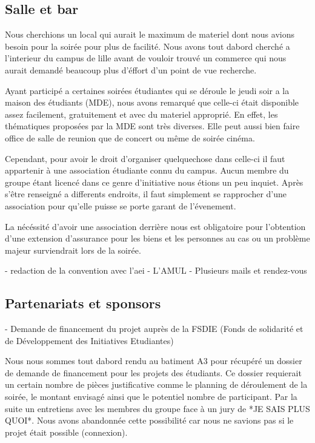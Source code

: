 \subsection{Salle et bar} %
\label{sub:salle_et_bar}

Nous cherchions un local qui aurait le maximum de materiel dont nous
avions besoin pour la soirée pour plus de facilité. Nous avons tout
dabord cherché a l'interieur du campus de lille avant de vouloir trouvé
un commerce qui nous aurait demandé beaucoup plus d'éffort d'un point de
vue recherche.

Ayant participé a certaines soirées étudiantes qui se déroule le jeudi
soir a la maison des étudiants (MDE), nous avons remarqué que celle-ci
était disponible assez facilement, gratuitement et avec du materiel
approprié. En effet, les thématiques proposées par la MDE sont très
diverses. Elle peut aussi bien faire office de salle de reunion que de
concert ou même de soirée cinéma.

Cependant, pour avoir le droit d'organiser quelquechose dans celle-ci il
faut appartenir à une association étudiante connu du campus. Aucun
membre du groupe étant licencé dans ce genre d'initiative nous étions un
peu inquiet. Après s'être renseigné a differents endroits, il faut
simplement se rapprocher d'une association pour qu'elle puisse se porte
garant de l'évenement.

La nécéssité d'avoir une association derrière nous est obligatoire pour
l'obtention d'une extension d'assurance pour les biens et les personnes
au cas ou un problème majeur surviendrait lors de la soirée.

- redaction de la convention avec l'aei
- L'AMUL
- Plusieurs mails et rendez-vous

\subsection{Partenariats et sponsors} %
\label{sub:partenariats_et_sponsors}

- Demande de financement du projet auprès de la FSDIE (Fonds de solidarité
  et de Développement des Initiatives Etudiantes)

  Nous nous sommes tout dabord rendu au batiment A3
  pour récupéré un dossier de demande de financement pour les projets des
  étudiants. Ce dossier requierait un certain nombre de pièces
  justificative comme le planning de déroulement de la soirée, le montant
  envisagé ainsi que le potentiel nombre de participant. Par la suite un
  entretiens avec les membres du groupe face à un jury de *JE SAIS
  PLUS QUOI*. Nous avons abandonnée cette possibilité car nous ne savions
  pas si le projet était possible (connexion).

